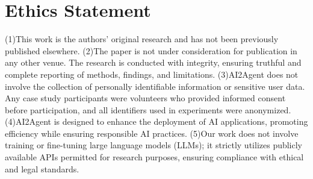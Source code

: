 \documentclass[11pt]{article}
\begin{document}
\section*{Ethics Statement}
(1)This work is the authors’ original research and has not been previously published elsewhere.
(2)The paper is not under consideration for publication in any other venue.
The research is conducted with integrity, ensuring truthful and complete reporting of methods, findings, and limitations.
(3)AI2Agent does not involve the collection of personally identifiable information or sensitive user data. Any case study participants were volunteers who provided informed consent before participation, and all identifiers used in experiments were anonymized.
(4)AI2Agent is designed to enhance the deployment of AI applications, promoting efficiency while ensuring responsible AI practices.
(5)Our work does not involve training or fine-tuning large language models (LLMs); it strictly utilizes publicly available APIs permitted for research purposes, ensuring compliance with ethical and legal standards.


\end{document}

